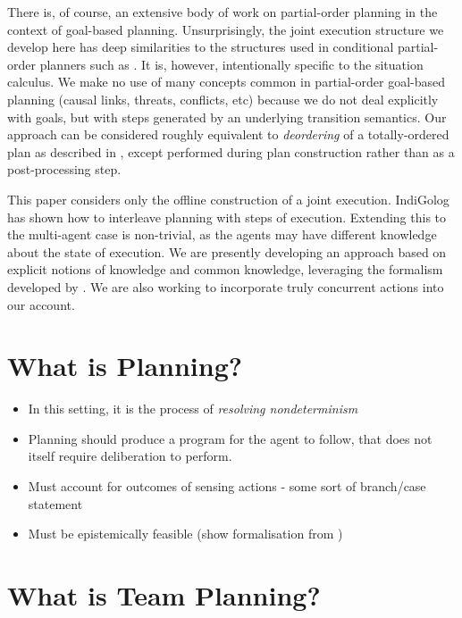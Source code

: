 There is, of course, an extensive body of work on partial-order planning
in the context of goal-based planning. Unsurprisingly, the joint execution
structure we develop here has deep similarities to the structures
used in conditional partial-order planners such as \citep{peot92conditional_nonlinear}.
It is, however, intentionally specific to the situation calculus.
We make no use of many concepts common in partial-order goal-based
planning (causal links, threats, conflicts, etc) because we do not
deal explicitly with goals, but with steps generated by an underlying
transition semantics. Our approach can be considered roughly equivalent
to \emph{deordering} of a totally-ordered plan as described in \citep{backstrom99reordering},
except performed during plan construction rather than as a post-processing
step.

This paper considers only the offline construction of a joint execution.
IndiGolog \citep{giacomo99indigolog} has shown how to interleave
planning with steps of execution. Extending this to the multi-agent
case is non-trivial, as the agents may have different knowledge about
the state of execution. We are presently developing an approach based
on explicit notions of knowledge and common knowledge, leveraging
the formalism developed by \citep{kelly07sc_know_obs}. We are also
working to incorporate truly concurrent actions into our account.


\section{What is Planning?}

\begin{itemize}
\item In this setting, it is the process of \emph{resolving nondeterminism} 
\item Planning should produce a program for the agent to follow, that does
not itself require deliberation to perform. \citet{levesque96what_is_planning,giacomo04sem_delib_indigolog} 
\item Must account for outcomes of sensing actions - some sort of branch/case
statement 
\item Must be epistemically feasible (show formalisation from \citet{giacomo04sem_delib_indigolog}) 
\end{itemize}

\section{What is Team Planning?}


